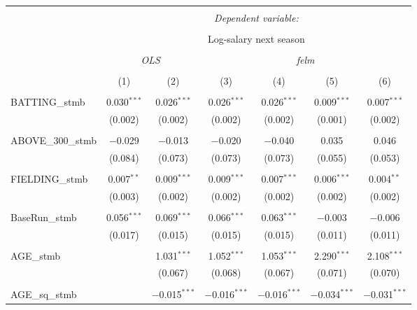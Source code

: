
\begin{table}[!htbp] \centering
  \caption{}
  \label{}
  \scriptsize
\begin{tabular}{@{\extracolsep{5pt}}lcccccc}
\\[-1.8ex]\hline
\hline \\[-1.8ex]
 & \multicolumn{6}{c}{\textit{Dependent variable:}} \\
\cline{2-7}
\\[-1.8ex] & \multicolumn{6}{c}{Log-salary next season} \\
\\[-1.8ex] & \multicolumn{2}{c}{\textit{OLS}} & \multicolumn{4}{c}{\textit{felm}} \\
\\[-1.8ex] & (1) & (2) & (3) & (4) & (5) & (6)\\
\hline \\[-1.8ex]
 BATTING\_stmb & 0.030$^{***}$ & 0.026$^{***}$ & 0.026$^{***}$ & 0.026$^{***}$ & 0.009$^{***}$ & 0.007$^{***}$ \\
  & (0.002) & (0.002) & (0.002) & (0.002) & (0.001) & (0.002) \\
  & & & & & & \\
 ABOVE\_300\_stmb & $-$0.029 & $-$0.013 & $-$0.020 & $-$0.040 & 0.035 & 0.046 \\
  & (0.084) & (0.073) & (0.073) & (0.073) & (0.055) & (0.053) \\
  & & & & & & \\
 FIELDING\_stmb & 0.007$^{**}$ & 0.009$^{***}$ & 0.009$^{***}$ & 0.007$^{***}$ & 0.006$^{***}$ & 0.004$^{**}$ \\
  & (0.003) & (0.002) & (0.002) & (0.002) & (0.002) & (0.002) \\
  & & & & & & \\
 BaseRun\_stmb & 0.056$^{***}$ & 0.069$^{***}$ & 0.066$^{***}$ & 0.063$^{***}$ & $-$0.003 & $-$0.006 \\
  & (0.017) & (0.015) & (0.015) & (0.015) & (0.011) & (0.011) \\
  & & & & & & \\
 AGE\_stmb &  & 1.031$^{***}$ & 1.052$^{***}$ & 1.053$^{***}$ & 2.290$^{***}$ & 2.108$^{***}$ \\
  &  & (0.067) & (0.068) & (0.067) & (0.071) & (0.070) \\
  & & & & & & \\
 AGE\_sq\_stmb &  & $-$0.015$^{***}$ & $-$0.016$^{***}$ & $-$0.016$^{***}$ & $-$0.034$^{***}$ & $-$0.031$^{***}$ \\

\end{tabular}
\end{table}
